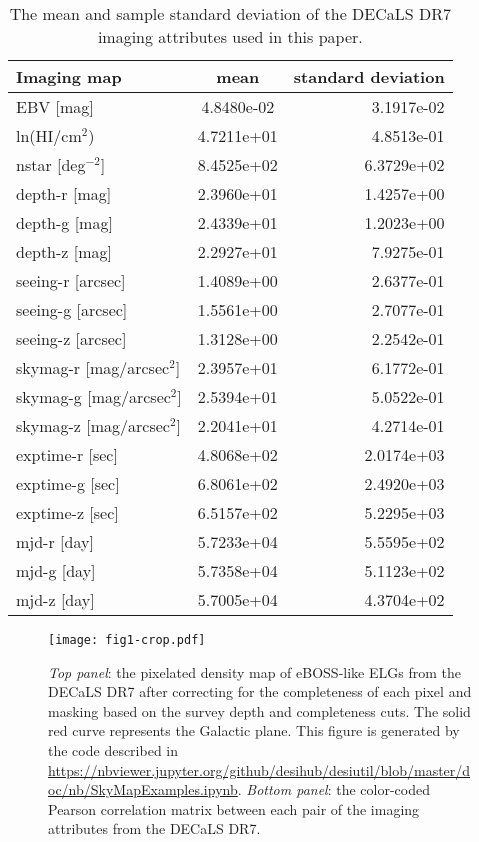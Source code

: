 \documentclass[fleqn, usenatbib]{mnras}
\begin{document}
\begin{table}
	\centering
	\caption{The mean and sample standard deviation of the DECaLS DR7 imaging attributes used in this paper.}
	\label{tab:meanstats}
	\begin{tabular}{lcr} %
	    \hline
		\hline
		Imaging map & mean & standard deviation \\
		\hline
         EBV [mag] & 4.8480e-02 & 3.1917e-02 \\ 
        ln(HI/cm$^{2}$) & 4.7211e+01 & 4.8513e-01 \\ 
        nstar [deg$^{-2}$] & 8.4525e+02 & 6.3729e+02 \\ 
        \hline
        depth-r [mag] & 2.3960e+01 & 1.4257e+00 \\ 
        depth-g [mag] & 2.4339e+01 & 1.2023e+00 \\ 
        depth-z [mag] & 2.2927e+01 & 7.9275e-01 \\ 
        \hline
        seeing-r [arcsec] & 1.4089e+00 & 2.6377e-01 \\ 
        seeing-g [arcsec]& 1.5561e+00 & 2.7077e-01 \\ 
        seeing-z [arcsec]& 1.3128e+00 & 2.2542e-01 \\ 
        \hline
        skymag-r [mag/arcsec$^{2}$] & 2.3957e+01 & 6.1772e-01 \\ 
        skymag-g [mag/arcsec$^{2}$] & 2.5394e+01 & 5.0522e-01 \\ 
        skymag-z [mag/arcsec$^{2}$]& 2.2041e+01 & 4.2714e-01 \\ 
        \hline
        exptime-r [sec] & 4.8068e+02 & 2.0174e+03 \\ 
        exptime-g [sec]& 6.8061e+02 & 2.4920e+03 \\ 
        exptime-z [sec]& 6.5157e+02 & 5.2295e+03 \\
        \hline
        mjd-r [day] & 5.7233e+04 & 5.5595e+02 \\ 
        mjd-g [day] & 5.7358e+04 & 5.1123e+02 \\ 
        mjd-z [day] & 5.7005e+04 & 4.3704e+02 \\ 
		\hline
		\hline
	\end{tabular}
\end{table}

\begin{figure*}
    \centering
    \texttt{[image: fig1-crop.pdf]}
    \caption{\textit{Top panel}: the pixelated density map of eBOSS-like ELGs from the DECaLS DR7 after correcting for the completeness of each pixel and masking based on the survey depth and completeness cuts. The solid red curve represents the Galactic plane. This figure is generated by the code described in \url{https://nbviewer.jupyter.org/github/desihub/desiutil/blob/master/doc/nb/SkyMapExamples.ipynb}. \textit{Bottom panel}: the color-coded Pearson correlation matrix between each pair of the imaging attributes from the DECaLS DR7.}
    \label{fig:eboss_dr7}
\end{figure*} 
 
\end{document}
